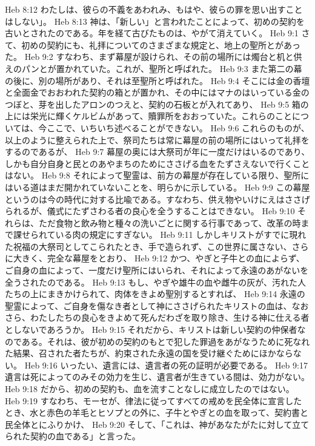 Heb 8:12  わたしは、彼らの不義をあわれみ、もはや、彼らの罪を思い出すことはしない」。
Heb 8:13  神は、「新しい」と言われたことによって、初めの契約を古いとされたのである。年を経て古びたものは、やがて消えていく。
Heb 9:1  さて、初めの契約にも、礼拝についてのさまざまな規定と、地上の聖所とがあった。
Heb 9:2  すなわち、まず幕屋が設けられ、その前の場所には燭台と机と供えのパンとが置かれていた。これが、聖所と呼ばれた。
Heb 9:3  また第二の幕の後に、別の場所があり、それは至聖所と呼ばれた。
Heb 9:4  そこには金の香壇と全面金でおおわれた契約の箱とが置かれ、その中にはマナのはいっている金のつぼと、芽を出したアロンのつえと、契約の石板とが入れてあり、
Heb 9:5  箱の上には栄光に輝くケルビムがあって、贖罪所をおおっていた。これらのことについては、今ここで、いちいち述べることができない。
Heb 9:6  これらのものが、以上のように整えられた上で、祭司たちは常に幕屋の前の場所にはいって礼拝をするのであるが、
Heb 9:7  幕屋の奥には大祭司が年に一度だけはいるのであり、しかも自分自身と民とのあやまちのためにささげる血をたずさえないで行くことはない。
Heb 9:8  それによって聖霊は、前方の幕屋が存在している限り、聖所にはいる道はまだ開かれていないことを、明らかに示している。
Heb 9:9  この幕屋というのは今の時代に対する比喩である。すなわち、供え物やいけにえはささげられるが、儀式にたずさわる者の良心を全うすることはできない。
Heb 9:10  それらは、ただ食物と飲み物と種々の洗いごとに関する行事であって、改革の時まで課せられている肉の規定にすぎない。
Heb 9:11  しかしキリストがすでに現れた祝福の大祭司としてこられたとき、手で造られず、この世界に属さない、さらに大きく、完全な幕屋をとおり、
Heb 9:12  かつ、やぎと子牛との血によらず、ご自身の血によって、一度だけ聖所にはいられ、それによって永遠のあがないを全うされたのである。
Heb 9:13  もし、やぎや雄牛の血や雌牛の灰が、汚れた人たちの上にまきかけられて、肉体をきよめ聖別するとすれば、
Heb 9:14  永遠の聖霊によって、ご自身を傷なき者として神にささげられたキリストの血は、なおさら、わたしたちの良心をきよめて死んだわざを取り除き、生ける神に仕える者としないであろうか。
Heb 9:15  それだから、キリストは新しい契約の仲保者なのである。それは、彼が初めの契約のもとで犯した罪過をあがなうために死なれた結果、召された者たちが、約束された永遠の国を受け継ぐためにほかならない。
Heb 9:16  いったい、遺言には、遺言者の死の証明が必要である。
Heb 9:17  遺言は死によってのみその効力を生じ、遺言者が生きている間は、効力がない。
Heb 9:18  だから、初めの契約も、血を流すことなしに成立したのではない。
Heb 9:19  すなわち、モーセが、律法に従ってすべての戒めを民全体に宣言したとき、水と赤色の羊毛とヒソプとの外に、子牛とやぎとの血を取って、契約書と民全体とにふりかけ、
Heb 9:20  そして、「これは、神があなたがたに対して立てられた契約の血である」と言った。
